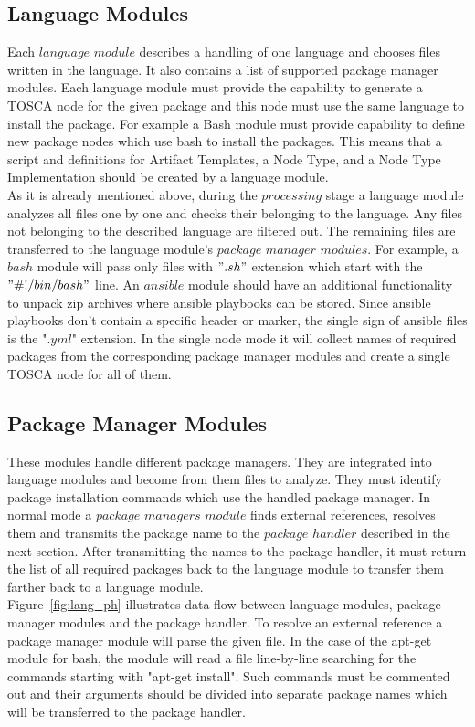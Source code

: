 \subsection{Language Modules} \label{subs:archlm}
Each $language$ $module$ describes a handling of one language and chooses files written in the language.
It also contains a list of supported package manager modules.
Each language module must provide the capability to generate a TOSCA node for the given package and this node must use the same language to install the package.
For example a Bash module must provide capability to define new package nodes which use bash to install the packages.
This means that a script and definitions for Artifact Templates, a Node Type, and a Node Type Implementation should be created by a language module.\\
As it is already mentioned above, during the $processing$ stage a language module analyzes all files one by one and checks their belonging to the language. 
Any files not belonging to the described language are filtered out.
The remaining files are transferred to the language module's $package$ $manager$ $modules$.
For example, a $bash$ module will pass only files with $".sh"$ extension which start with the $"\#!/bin/bash"$ line.
An $ansible$ module should have an additional functionality to unpack zip archives where ansible playbooks can be stored.
Since ansible playbooks don't contain a specific header or marker, the single sign of ansible files is the "$.yml$" extension. 
In the single node mode it will collect names of required packages from the corresponding package manager modules and create a single TOSCA node for all of them.

\subsection{Package Manager Modules} \label{subs:archpmm}
These modules handle different package managers.
They are integrated into language modules and become from them files to analyze.
They must identify package installation commands which use the handled package manager.
In normal mode a $package$ $managers$ $module$ finds external references, resolves them and transmits the package name to the $package$ $handler$ described in the next section.
After transmitting the names to the package handler, it must return the list of all required packages back to the language module to transfer them farther back to a language module.\\
Figure~\ref{fig:lang_ph} illustrates data flow between language modules, package manager modules and the package handler.
To resolve an external reference a package manager module will parse the given file. 
In the case of the apt-get module for bash, the module will read a file line-by-line searching for the commands starting with "apt-get install".
Such commands must be commented out and their arguments should be divided into separate package names which will be transferred to the package handler. 


